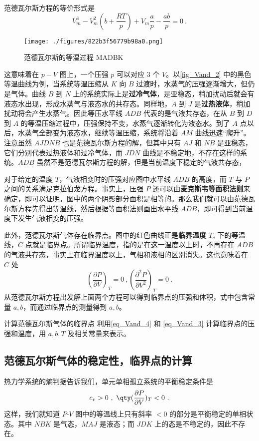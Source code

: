 范德瓦尔斯方程的等价形式是
\begin{equation}\label{eq_Vand_4}
V_m^3-V_m^2(b+\frac{RT}{p})+V_m\frac{a}{p}-\frac{ab}{p}=0~.
\end{equation}

\begin{figure}[ht]
\centering
\texttt{[image: ./figures/822b3f56779b98a0.png]}
\caption{范德瓦尔斯的等温过程 MADBK} \label{fig_Vand_2}
\end{figure}


这意味着在 $p-V$ 图上，一个压强 $p$ 可以对应 $3$ 个 $V$。以\autoref{fig_Vand_2} 中的黑色等温曲线为例，当系统等温压缩从 $K$ 向 $B$ 过渡时，水蒸气的压强逐渐增大，但仍是气体。曲线 $B$ 到 $N$ 上的系统实际上是\textbf{过冷气体}，是亚稳态，稍加扰动后就会有液态水出现，形成水蒸气与液态水的共存态。同样地，$A$ 到 $J$ 是\textbf{过热液体}，稍加扰动将会产生水蒸气。因此等压水平线 $ADB$ 代表的是气液共存态，在从 $B$ 到 $D$ 到 $A$ 的等温压缩过程中，压强保持不变，水蒸气逐渐转化为液态水。到了 $A$ 点以后，水蒸气全部变为液态水，继续等温压缩，系统将沿着 $AM$ 曲线迅速“爬升”。注意虽然 $AJDNB$ 也是范德瓦尔斯方程的解，但其中只有 $AJ$ 和 $NB$ 是亚稳态，它们分别代表过热液体和过冷气体，而 $JDN$ 曲线是不稳定地，不存在这样的系统。$ADB$ 虽然不是范德瓦尔斯方程的解，但是当前温度下稳定的气液共存态，

对于给定的温度 $T$，气液相变时的压强对应图中水平线 $ADB$ 的高度，而 $T$ 与 $P$ 之间的关系满足克拉伯龙方程。事实上，压强 $P$ 还可以由\textbf{麦克斯韦等面积法则}来确定，即可以证明，图中的两个阴影部分面积是相等的。那么我们就可以由范德瓦尔斯方程先得出等温线，然后根据等面积法则画出水平线 $ADB$，即可得到当前温度下发生气液相变的压强。

此外，范德瓦尔斯气体存在临界点。图中的红色曲线正是\textbf{临界温度} $T_c$ 下的等温线，$C$ 点就是临界点。所谓临界温度，指的是在这一温度以上时，不再存在 $ADB$ 的气液共存态，事实上在临界温度以上，气相和液相的区别消失。这也意味着在 $C$ 处
\begin{equation}\label{eq_Vand_3}
\left(\frac{\partial P}{\partial V}\right)_T=0~,
\left(\frac{\partial^2 P}{\partial V^2}\right)_T=0~.
\end{equation}
从范德瓦尔斯方程出发解上面两个方程可以得到临界点的压强和体积，式中包含常量 $a,b$，而通过临界点的测量得到 $a,b$。
\begin{exercise}{计算范德瓦尔斯气体的临界点}
利用\autoref{eq_Vand_4} 和 \autoref{eq_Vand_3} 计算临界点的压强和温度，用 $a,b,T$ 及相关常量来表示。
\end{exercise}
\subsection{范德瓦尔斯气体的稳定性，临界点的计算}
热力学系统的熵判据告诉我们，单元单相孤立系统的平衡稳定条件是
\begin{equation}\label{eq_Vand_1}
c_v>0~,\ \qty(\frac{\partial P}{\partial V})_T<0~.
\end{equation}
这样，我们就知道 $P$-$V$ 图中的等温线上只有斜率 $<0$ 的部分是平衡稳定的单相状态。其中 $NBK$ 是气态，$MAJ$ 是液态；而 $JDK$ 上的态是不稳定的，因此不存在。

